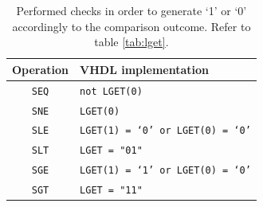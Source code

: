 \begin{table}[H]
    \begin{center}
        \begin{tabular}{ c | l}
            \textbf{Operation} & \textbf{VHDL implementation} \\
            \hline
            \texttt{SEQ} & \texttt{not LGET(0)} \\
            \texttt{SNE} & \texttt{LGET(0)} \\
            \texttt{SLE} & \texttt{LGET(1) = `0' or LGET(0) = `0'} \\
            \texttt{SLT} & \texttt{LGET = "01"} \\
            \texttt{SGE} & \texttt{LGET(1) = `1' or LGET(0) = `0'} \\
            \texttt{SGT} & \texttt{LGET = "11"}
            
        \end{tabular}
        \caption{Performed checks in order to generate `1' or `0' accordingly to the comparison outcome. Refer to table \ref{tab:lget}.}
    \end{center}
\end{table}


